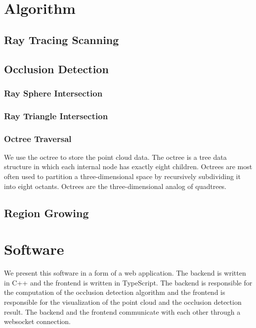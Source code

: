 \documentclass[11pt, a4paper,oneside,chapterprefix=false]{scrbook}
\begin{document}
\section{Algorithm} \label{sec:algorithm}

\subsection{Ray Tracing Scanning}

\subsection{Occlusion Detection}

\subsubsection{Ray Sphere Intersection}

\subsubsection{Ray Triangle Intersection}

\subsubsection{Octree Traversal}
We use the octree to store the point cloud data. The octree is a tree data structure in which each internal node has exactly eight children. Octrees are most often used to partition a three-dimensional space by recursively subdividing it into eight octants. Octrees are the three-dimensional analog of quadtrees.

\subsection{Region Growing}

\section{Software} \label{sec:software}
We present this software in a form of a web application. The backend is written in C++ and the frontend is written in TypeScript. The backend is responsible for the computation of the occlusion detection algorithm and the frontend is responsible for the visualization of the point cloud and the occlusion detection result. The backend and the frontend communicate with each other through a websocket connection. 
\end{document}
